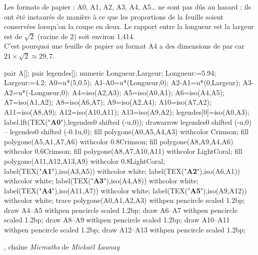 \vspace*{-5mm}
\begin{changemargin}{-10mm}{-10mm}

\begin{debat} 
   Les formats de papier : A0, A1, A2, A3, A4, A5\dots{} ne sont pas dûs au hasard : ils ont été instaurés de manière à ce que les proportions de la feuille soient conservées lorsqu'on la coupe en deux. Le rapport entre la longueur est la largeur est de $\sqrt2$ (racine de 2) soit environ 1,414. \\
   C'est pourquoi une feuille de papier au format A4 a des dimensions de  par  car $21\times\sqrt2 \approx29,7$.
   \begin{center}
      \begin{Geometrie}[CoinHD={(15u,5u)}]
         pair A[];
         pair legendes[];
         numeric Longueur,Largeur;
         Longueur:=5.94;
         Largeur:=4.2;
         A0=u*(5,0.5);
         A1-A0=u*(Longueur,0);
         A2-A1=u*(0,Largeur);
         A3-A2=u*(-Longueur,0);         
         A4=iso(A2,A3);
         A5=iso(A0,A1);         
         A6=iso(A4,A5);
         A7=iso(A1,A2);
         A8=iso(A6,A7);
         A9=iso(A2,A4);
         A10=iso(A7,A2);
         A11=iso(A8,A9);
         A12=iso(A10,A11);
         A13=iso(A9,A2);
         legendes[0]=iso(A0,A3);
         label.lft(TEX("\textbf{A0}"),legendes0 shifted (-u,0));
         drawarrow legendes0 shifted (-u,0) -- legendes0 shifted (-0.1u,0);
         fill polygone(A0,A5,A4,A3) withcolor Crimson;
         fill polygone(A5,A1,A7,A6) withcolor 0.8Crimson;
         fill polygone(A8,A9,A4,A6) withcolor 0.6Crimson;
         fill polygone(A8,A7,A10,A11) withcolor LightCoral;
         fill polygone(A11,A12,A13,A9) withcolor 0.8LightCoral;
         label(TEX("\textbf{A1}"),iso(A3,A5)) withcolor white;
         label(TEX("\textbf{A2}"),iso(A6,A1)) withcolor white;
         label(TEX("\textbf{A3}"),iso(A4,A8)) withcolor white;
         label(TEX("\textbf{A4}"),iso(A11,A7)) withcolor white;
         label(TEX("\textbf{A5}"),iso(A9,A12)) withcolor white;
         trace polygone(A0,A1,A2,A3) withpen pencircle scaled 1.2bp;
         draw A4--A5 withpen pencircle scaled 1.2bp;
         draw A6--A7 withpen pencircle scaled 1.2bp;
         draw A8--A9 withpen pencircle scaled 1.2bp;
         draw A10--A11 withpen pencircle scaled 1.2bp;
         draw A12--A13 withpen pencircle scaled 1.2bp;
      \end{Geometrie}
   \end{center}
   \bigskip
   \begin{cadre}[B2][F4]
      \begin{center}
         , chaîne {\it Micmaths} de {\it Mickaël Launay}
      \end{center}
   \end{cadre}   
\end{debat}
\end{changemargin}